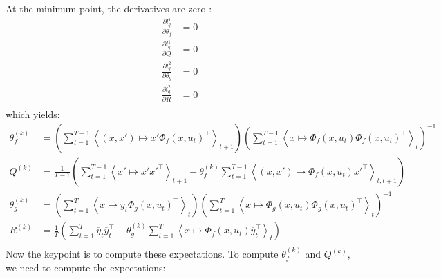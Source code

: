 At the minimum point, the derivatives are zero :
\begin{align*}
  \frac{\partial l^1_q}{\partial \theta_f} &= 0 \\
  \frac{\partial l^1_q}{\partial Q} &= 0 \\
  \frac{\partial l^2_q}{\partial \theta_g} &= 0 \\
  \frac{\partial l^2_q}{\partial R} &= 0 \\
\end{align*}
which yields:
\begin{align*}
  \theta_f^{(k)} &=
    \left(
      \sum_{t=1}^{T-1}{\left< (x,x') \mapsto x' \Phi_f(x,u_t)^{\top} \right>_{t+1}}
    \right)
    \left(
      \sum_{t=1}^{T-1}{\left< x \mapsto \Phi_f(x, u_t)\Phi_f(x,u_t)^{\top} \right>_{t}}
    \right)^{-1}
  \\
  Q^{(k)} &=
    \frac{1}{T-1}
    \left(
      \sum_{t=1}^{T-1}{\left< x' \mapsto x'x'^{\top} \right>_{t+1}} -
      \theta_f^{(k)} \sum_{t=1}^{T-1}{\left< (x,x') \mapsto \Phi_f(x, u_t) x'^{\top} \right>_{t,t+1}}
    \right)
  \\
  \theta_g^{(k)} &=
    \left(
      \sum_{t=1}^{T}{\left< x \mapsto \overline{y}_{t}\Phi_g(x,u_t)^{\top} \right>_{t}}
    \right)
    \left(
      \sum_{t=1}^{T}{\left< x \mapsto \Phi_g(x,u_t)\Phi_g(x,u_t)^{\top} \right>_{t}}
    \right)^{-1}
  \\
  R^{(k)} &=
    \frac{1}{T}
    \left(
      \sum_{t=1}^{T}{\overline{y}_t \overline{y}_t^{\top}} -
      \theta_g^{(k)} \sum_{t=1}^{T}{\left< x \mapsto \Phi_f(x, u_t) \overline{y}_t^{\top} \right>_{t}}
    \right)
  \\
\end{align*}
Now the keypoint is to compute these expectations.
To compute $\theta_f^{(k)}$ and $Q^{(k)}$, we need to compute the expectations:
